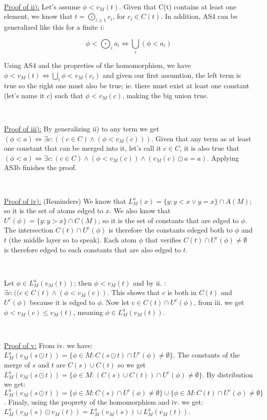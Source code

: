 \documentclass[a4paper, 11pt]{article}
\begin{document}
\

\noindent
\underline{Proof of ii):} Let's assume $\phi < v_M(t)$. Given that C(t) contains at least one element, we know that $t = \bigodot_{i \geq 1} c_i$, for $c_i \in C(t)$. In addition, AS4 can be generalized like this for a finite $i$:

$$\phi < \bigodot_i a_i \Leftrightarrow \bigcup_i (\phi < a_i)$$

Using AS4 and the propreties of the homomorphism, we have $\phi < v_M(t) \Leftrightarrow \bigcup_i \phi < v_M(c_i)$ and given our first assumtion, the left term is true so the right one must also be true; ie. there must exist at least one constant (let's name it $c$) such that $\phi < v_M(c)$, making the big union true.

\

\noindent
\underline{Proof of iii):} By generalizing ii) to any term we get $(\phi < a) \Leftrightarrow \exists c : ((c \in C) \land (\phi < v_M(c)))$. Given that any term as at least one constant that can be merged into it, let's call it $c \in C$, it is also true that $(\phi < a) \Leftrightarrow \exists c : (c \in C) \land (\phi < v_M(c)) \land (v_M(c) \odot a = a)$. Applying AS3b finishes the proof.



\

\noindent
\underline{Proof of iv):} (Reminders) We know that $L_M^a(x) =\{y : y < x \lor y = x\} \cap A(M)$; so it is the set of atoms edged to $x$. We also know that $U^c(\phi) =\{y : y > x\} \cap C(M)$; so it is the set of constants that are edged to $\phi$. The intersection $C(t) \cap U^c(\phi)$ is therefore the constants edeged both to $\phi$ and $t$ (the middle layer so to speak). Each atom $\phi$ that verifies $C(t) \cap U^c(\phi) \neq \emptyset$ is therefore edged to each constants that are also edged to $t$.

\

Let $\phi \in L_M^a(v_M(t))$; then $\phi < v_M(t)$ and by ii. : $\exists c : ((c \in C(t) \land (\phi < v_M(c))$. This shows that $c$ is both in $C(t)$ and $U^c(\phi)$ because it is edged to $\phi$. Now let $c \in C(t) \cap U^c(\phi)$, from iii. we get $\phi < v_M(c) \leq v_M(t)$, meaning $\phi \in L_M^a(v_M(t))$. 

\

\noindent
\underline{Proof of v:} From iv. we have: $L_M^a(v_M(s \odot t)) =\{\phi \in M : C(s \odot t) \cap U^c(\phi) \neq \emptyset\}$. The constants of the merge of $s$ and $t$ are $C(s) \cup C(t)$ so we get $L_M^a(v_M(s \odot t)) =\{\phi \in M : (C(s) \cup C(t)) \cap U^c(\phi) \neq \emptyset\}$. By distribution we get: $L_M^a(v_M(s \odot t)) =\{\phi \in M : C(s) \cap U^c(\phi) \neq \emptyset\} \cup \{\phi \in M : C(t) \cap U^c(\phi) \neq \emptyset\}$. Finaly, using the proprety of the homomorphism and iv. we get: $L_M^a(v_M(s) \odot v_M(t)) = L_M^a(v_M(s)) \cup L_M^a(v_M(t))$.
\end{document}
